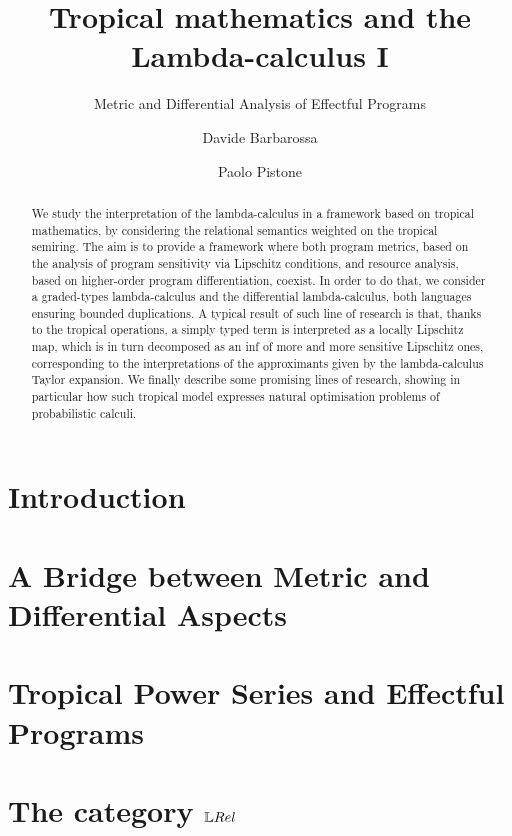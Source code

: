 \documentclass[a4paper,english, UKenglish,cleveref, autoref, thm-restate]{lipics-v2021}
\title{Tropical mathematics and the Lambda-calculus I}
\subtitle{Metric and Differential Analysis of Effectful Programs
} %
\author{Davide {Barbarossa}}{Dipartimento di Informatica, Universit\`a di Bologna, %
Italy%
\and \url{https://lipn.univ-paris13.fr/\~barbarossa/index.html} }{davide.barbarossa@unibo.it}{https://orcid.org/0000-0003-4608-8282}{%
}%
\author{Paolo {Pistone}}{Dipartimento di Informatica, Universit\`a di Bologna, %
Italy%
\and \url{%
} }{paolo.pistone2@unibo.it}{%
}{%
}
\begin{document}
\maketitle

\begin{abstract}
We study the interpretation of the lambda-calculus in a framework based on tropical mathematics, by considering the relational semantics weighted on the tropical semiring. The aim is to provide a framework where both program metrics, based on the analysis of program sensitivity via Lipschitz conditions, and resource analysis, based on higher-order program differentiation, coexist. In order to do that, we consider a graded-types lambda-calculus and the differential lambda-calculus, both languages ensuring bounded duplications.
A typical result of such line of research is that, thanks to the tropical operations, a simply typed term is interpreted as a locally Lipschitz map, which is in turn decomposed as an inf of more and more sensitive Lipschitz ones, corresponding to the interpretations of the approximants given by the lambda-calculus Taylor expansion.
We finally describe some promising lines of research, showing in particular how such tropical model expresses natural optimisation problems of probabilistic calculi.
\end{abstract}

\section{Introduction}



\section{A Bridge between Metric and Differential Aspects}\label{section5bis}



\section{Tropical Power Series and Effectful Programs}\label{section2}



\section{The category $\LREL$%
}\label{section3}

\end{document}
